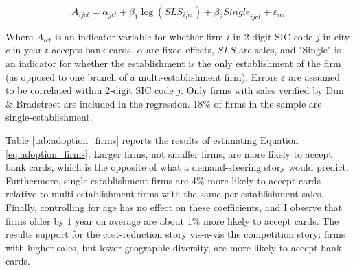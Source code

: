 \documentclass[12pt,english]{article}
\begin{document}
\begin{equation}\label{eq:adoption_firms}
    A_{ijct} = \alpha_{jct} + \beta_1 \log{\left(SLS_{ijct}\right)} + \beta_2 {Single}_{ijct} + \varepsilon_{ict}
\end{equation}

Where $A_{ict}$ is an indicator variable for whether firm $i$ in 2-digit SIC code $j$ in city $c$ in year $t$ accepts bank cards. $\alpha$ are fixed effects, $SLS$ are sales, and "Single" is an indicator for whether the establishment is the only establishment of the firm (as opposed to one branch of a multi-establishment firm). Errors $\varepsilon$ are assumed to be correlated within 2-digit SIC code $j$. Only firms with sales verified by Dun \& Bradstreet are included in the regression. 18\% of firms in the sample are single-establishment. 

Table \ref{tab:adoption_firms} reports the results of estimating Equation \ref{eq:adoption_firms}. Larger firms, not smaller firms, are more likely to accept bank cards, which is the opposite of what a demand-steering story would predict. Furthermore, single-establishment firms are 4\% more likely to accept cards relative to multi-establishment firms with the same per-establishment sales. Finally, controlling for age has no effect on these coefficients, and I observe that firms older by 1 year on average are about 1\% more likely to accept cards. The results support for the cost-reduction story vis-a-vis the competition story: firms with higher sales, but lower geographic diversity, are more likely to accept bank cards. 

\begin{table}[!ht]
\caption{Which Firms Adopt Bank Cards?}\label{tab:adoption_firms}

 
\end{table}
\end{document}
